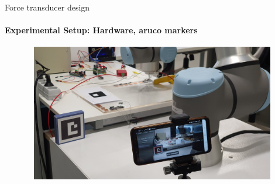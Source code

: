 \documentclass[aspectratio=169,xcolor=table]{beamer}
\begin{document}
\begin{frame}[t]{Force transducer design}
    \framesubtitle{Experimental Setup: Hardware, aruco markers}
    \vspace{-15pt}
    \begin{figure}[H]
        \centering\includegraphics[height=6cm,width=1\textwidth,keepaspectratio]{exp_stand2}
        \label{fig:exp_stand2}
    \end{figure}
\end{frame}
\end{document}
